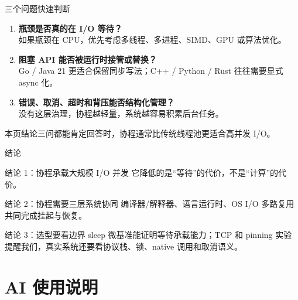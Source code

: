 \documentclass[UTF8,aspectratio=169,11pt]{ctexbeamer}
\newcommand{\takeaway}[1]{\begin{block}{本页结论}#1\end{block}}
\begin{document}
\begin{frame}{三个问题快速判断}
  \begin{enumerate}
    \item \textbf{瓶颈是否真的在 I/O 等待？}\\
    {\small 如果瓶颈在 CPU，优先考虑多线程、多进程、SIMD、GPU 或算法优化。}
    \vspace{0.2cm}
    \item \textbf{阻塞 API 能否被运行时接管或替换？}\\
    {\small Go / Java 21 更适合保留同步写法；C++ / Python / Rust 往往需要显式 async 化。}
    \vspace{0.2cm}
    \item \textbf{错误、取消、超时和背压能否结构化管理？}\\
    {\small 没有这层治理，协程越轻量，系统越容易积累后台任务。}
  \end{enumerate}
  \takeaway{三问都能肯定回答时，协程通常比传统线程池更适合高并发 I/O。}
\end{frame}

\begin{frame}{结论}
  \begin{block}{结论 1：协程承载大规模 I/O 并发}
    它降低的是“等待”的代价，不是“计算”的代价。
  \end{block}
  \begin{block}{结论 2：协程需要三层系统协同}
    编译器/解释器、语言运行时、OS I/O 多路复用共同完成挂起与恢复。
  \end{block}
  \begin{block}{结论 3：选型要看边界}
    sleep 微基准能证明等待承载能力；TCP 和 pinning 实验提醒我们，真实系统还要看协议栈、锁、native 调用和取消语义。
  \end{block}
\end{frame}

\section{AI 使用说明}
\end{document}
